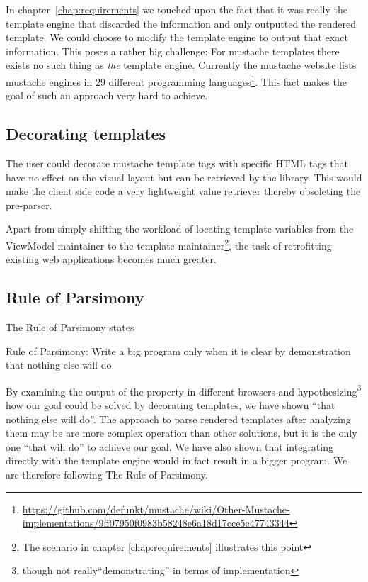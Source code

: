 \documentclass[thesis.tex]{subfiles}
\begin{document}
In chapter~\ref{chap:requirements} we touched upon the fact that it was really
the template engine that discarded the information and only outputted the
rendered template. We could choose to modify the template engine to output that
exact information. This poses a rather big challenge:
For mustache templates there exists no such thing as \emph{the} template engine.
Currently the mustache website lists mustache engines in 29 different
programming languages\footnote{
      \url{https://github.com/defunkt/mustache/wiki/Other-Mustache-implementations/9ff07950f0983b58248e6a18d17cce5c47743344}
}.
This fact makes the goal of such an approach very hard to achieve.

\subsection{Decorating templates}

The user could decorate mustache template tags with specific HTML tags that
have no effect on the visual layout but can be retrieved by the library.
This would make the client side code a very lightweight value retriever
thereby obsoleting the pre-parser.

Apart from simply shifting the workload of locating template variables
from the ViewModel maintainer to the template maintainer\footnote{The scenario
in chapter \ref{chap:requirements} illustrates this point},
the task of retrofitting existing web applications becomes much greater.

\subsection{Rule of Parsimony}

The Rule of Parsimony states
\begin{citequote}{\cite[Chapter 1]{UXART}}
Rule of Parsimony: Write a big program only when it is clear by demonstration
that nothing else will do.
\end{citequote}

By examining the output of the  property in different browsers
and hypothesizing\footnote{though not really``demonstrating'' in terms of
implementation} how our goal could be solved by decorating templates,
we have shown ``that nothing else will do''.
The approach to parse rendered templates after analyzing them may be are
more complex operation than other solutions, but it is the only one
``that will do'' to achieve our goal. We have also shown that integrating
directly with the template engine would in fact result in a bigger program.
We are therefore following The Rule of Parsimony.
\end{document}

